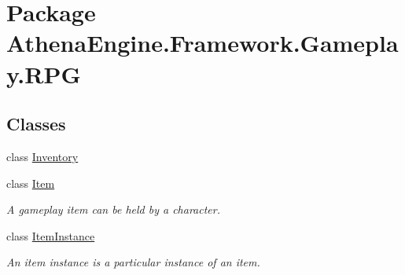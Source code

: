 \hypertarget{namespace_athena_engine_1_1_framework_1_1_gameplay_1_1_r_p_g}{\section{Package Athena\-Engine.\-Framework.\-Gameplay.\-R\-P\-G}
\label{namespace_athena_engine_1_1_framework_1_1_gameplay_1_1_r_p_g}
}
\subsection*{Classes}
\begin{DoxyCompactItemize}
\item 
class \hyperlink{class_athena_engine_1_1_framework_1_1_gameplay_1_1_r_p_g_1_1_inventory}{Inventory}
\item 
class \hyperlink{class_athena_engine_1_1_framework_1_1_gameplay_1_1_r_p_g_1_1_item}{Item}
\begin{DoxyCompactList}\small\item\em A gameplay item can be held by a character. \end{DoxyCompactList}\item 
class \hyperlink{class_athena_engine_1_1_framework_1_1_gameplay_1_1_r_p_g_1_1_item_instance}{Item\-Instance}
\begin{DoxyCompactList}\small\item\em An item instance is a particular instance of an item. \end{DoxyCompactList}\end{DoxyCompactItemize}
